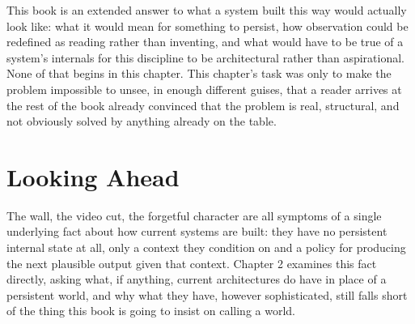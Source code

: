 This book is an extended answer to what a system built this way would actually look like: what it would mean for something to persist, how observation could be redefined as reading rather than inventing, and what would have to be true of a system's internals for this discipline to be architectural rather than aspirational. None of that begins in this chapter. This chapter's task was only to make the problem impossible to unsee, in enough different guises, that a reader arrives at the rest of the book already convinced that the problem is real, structural, and not obviously solved by anything already on the table.

\section{Looking Ahead}

The wall, the video cut, the forgetful character are all symptoms of a single underlying fact about how current systems are built: they have no persistent internal state at all, only a context they condition on and a policy for producing the next plausible output given that context. Chapter 2 examines this fact directly, asking what, if anything, current architectures do have in place of a persistent world, and why what they have, however sophisticated, still falls short of the thing this book is going to insist on calling a world.
